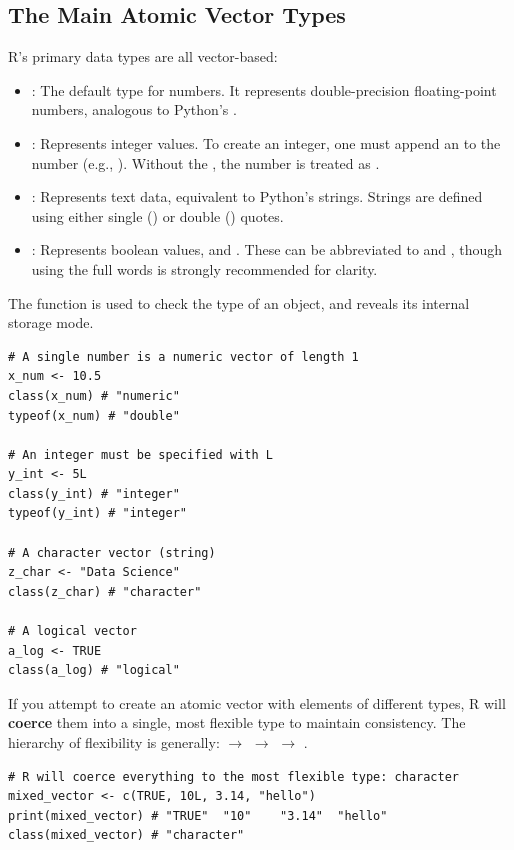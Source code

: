 \subsection*{The Main Atomic Vector Types}
R's primary data types are all vector-based:
\begin{itemize}
    \item \textbf{}: The default type for numbers. It represents double-precision floating-point numbers, analogous to Python's .
    \item \textbf{}: Represents integer values. To create an integer, one must append an  to the number (e.g., ). Without the , the number is treated as .
    \item \textbf{}: Represents text data, equivalent to Python's strings. Strings are defined using either single () or double () quotes.
    \item \textbf{}: Represents boolean values,  and . These can be abbreviated to  and , though using the full words is strongly recommended for clarity.
\end{itemize}

\begin{example}
The  function is used to check the type of an object, and  reveals its internal storage mode.
\begin{verbatim}
# A single number is a numeric vector of length 1
x_num <- 10.5
class(x_num) # "numeric"
typeof(x_num) # "double"

# An integer must be specified with L
y_int <- 5L
class(y_int) # "integer"
typeof(y_int) # "integer"

# A character vector (string)
z_char <- "Data Science"
class(z_char) # "character"

# A logical vector
a_log <- TRUE
class(a_log) # "logical"
\end{verbatim}
\end{example}

\begin{remark}
If you attempt to create an atomic vector with elements of different types, R will \textbf{coerce} them into a single, most flexible type to maintain consistency. The hierarchy of flexibility is generally:  $\to$  $\to$  $\to$ .
\begin{verbatim}
# R will coerce everything to the most flexible type: character
mixed_vector <- c(TRUE, 10L, 3.14, "hello")
print(mixed_vector) # "TRUE"  "10"    "3.14"  "hello"
class(mixed_vector) # "character"
\end{verbatim}
\end{remark}

